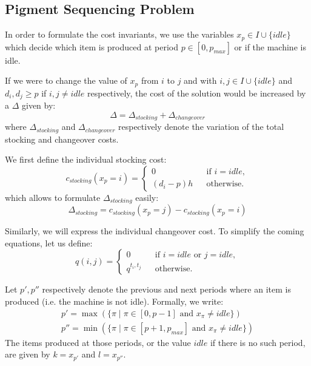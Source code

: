\subsection{Pigment Sequencing Problem}

In order to formulate the cost invariants, we use the variables $x_p \in I \cup \{ idle \}$
which decide which item is produced at period $p \in [0,p_{max}]$ or if the machine is idle.


If we were to change the value of $x_p$ from $i$ to $j$ and with $i,j \in I \cup \{ idle \}$
and $d_i, d_j \ge p$ if $i,j \ne idle$ respectively,
the cost of the solution would be increased by a $\Delta$ given by:
\begin{equation}
    \Delta = \Delta_{stocking} + \Delta_{changeover}
\end{equation}
where $\Delta_{stocking}$ and $\Delta_{changeover}$ respectively denote the variation of the total stocking and changeover costs.

We first define the individual stocking cost:
\begin{equation}
    c_{stocking}(x_p = i) = \left\{ \begin{array}{lcl}
        0 && \text{if }i=idle, \\
        (d_i - p) h && \text{otherwise}.
    \end{array} \right.
\end{equation}
which allows to formulate $\Delta_{stocking}$ easily:
\begin{equation}
    \Delta_{stocking} = c_{stocking}(x_p = j) - c_{stocking}(x_p = i)
\end{equation}

Similarly, we will express the individual changeover cost.
To simplify the coming equations, let us define:
\begin{equation}
    q(i,j) = \left\{ \begin{array}{lcl}
        0 && \text{if }i=idle\text{ or }j=idle, \\
        q^{t_i,t_j} && \text{otherwise}.
    \end{array} \right.
\end{equation}

Let $p',p''$ respectively denote the previous and next periods where an item is produced (i.e. the machine is not idle).
Formally, we write:
\begin{align}
    p' = \max \left(\{ \pi \mid \pi \in [0,p-1] \text{ and } x_\pi \ne idle \} \right) \\
    p'' = \min \left(\{ \pi \mid \pi \in [p+1,p_{max}] \text{ and } x_\pi \ne idle \} \right)
\end{align}
The items produced at those periods, or the value $idle$ if there is no such period, are given by $k = x_{p'}$ and $l = x_{p''}$.

